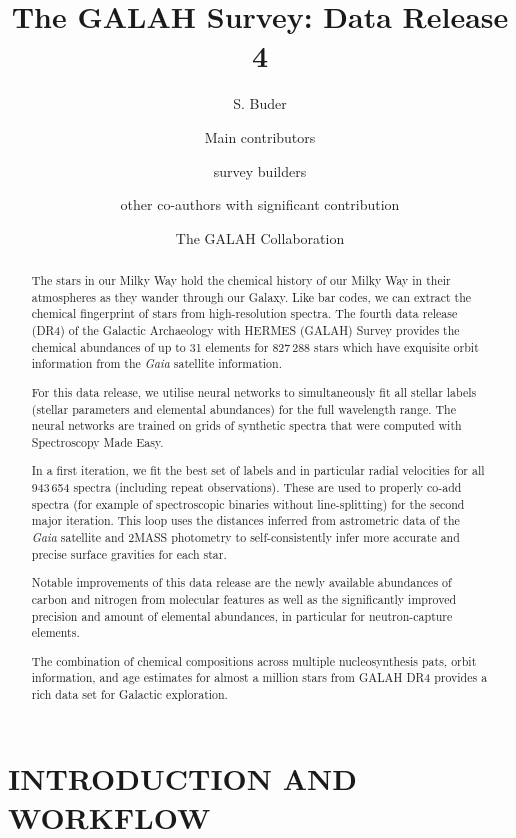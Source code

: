 \documentclass[
  journal=pasa,
  manuscript=research-paper, %
  year=2023,
  volume=37
]{cup-journal}
\title{The GALAH Survey: Data Release 4}
\author{S. Buder}
\affiliation{Research School of Astronomy \& Astrophysics, Australian National University, Canberra, ACT 2611, Australia}
\affiliation{ARC Centre of Excellence for All Sky Astrophysics in 3 Dimensions (ASTRO 3D), Australia}
\author{Main contributors}
\author{survey builders}
\author{other co-authors with significant contribution}
\author{The GALAH Collaboration}
\newcommand{\Gaia}{\textit{Gaia}\xspace}
\begin{document}
\begin{abstract}

The stars in our Milky Way hold the chemical history of our Milky Way in their atmospheres as they wander through our Galaxy. Like bar codes, we can extract the chemical fingerprint of stars from high-resolution spectra. The fourth data release (DR4) of the Galactic Archaeology with HERMES (GALAH) Survey provides the chemical abundances of up to 31 elements for 827\,288 stars which have exquisite orbit information from the \Gaia satellite information.

For this data release, we utilise neural networks to simultaneously fit all stellar labels (stellar parameters and elemental abundances) for the full wavelength range. The neural networks are trained on grids of synthetic spectra that were computed with Spectroscopy Made Easy.

In a first iteration, we fit the best set of labels and in particular radial velocities for all 943\,654 spectra (including repeat observations). These are used to properly co-add spectra (for example of spectroscopic binaries without line-splitting) for the second major iteration. This loop uses the distances inferred from astrometric data of the \Gaia satellite and 2MASS photometry to self-consistently infer more accurate and precise surface gravities for each star.

Notable improvements of this data release are the newly available abundances of carbon and nitrogen from molecular features as well as the significantly improved precision and amount of elemental abundances, in particular for neutron-capture elements.

The combination of chemical compositions across multiple nucleosynthesis pats, orbit information, and age estimates for almost a million stars from GALAH DR4 provides a rich data set for Galactic exploration.

\end{abstract}

\section{INTRODUCTION AND WORKFLOW}
\label{sec:introduction}
\end{document}
